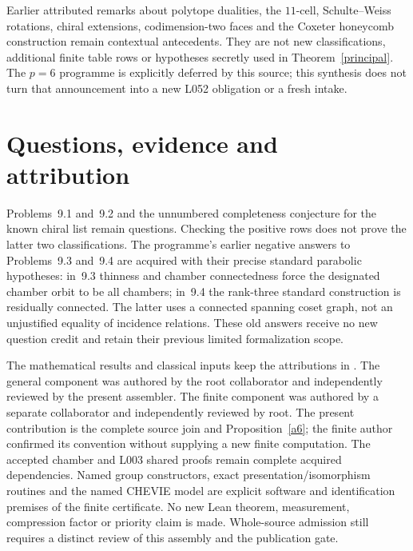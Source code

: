 \documentclass[11pt,a4paper]{article}
\begin{document}
Earlier attributed remarks about polytope dualities, the $11$-cell,
Schulte--Weiss rotations, chiral extensions, codimension-two faces and the
Coxeter honeycomb construction remain contextual antecedents. They are not
new classifications, additional finite table rows or hypotheses secretly
used in Theorem~\ref{principal}. The $p=6$ programme is explicitly deferred
by this source; this synthesis does not turn that announcement into a new
L052 obligation or a fresh intake.

\section{Questions, evidence and attribution}
Problems~9.1 and~9.2 and the unnumbered completeness conjecture for the
known chiral list remain questions. Checking the positive rows does not
prove the latter two classifications. The programme's earlier negative
answers to Problems~9.3 and~9.4 are acquired with their precise standard
parabolic hypotheses: in~9.3 thinness and chamber connectedness force the
designated chamber orbit to be all chambers; in~9.4 the rank-three standard
construction is residually connected. The latter uses a connected spanning
coset graph, not an unjustified equality of incidence relations. These old
answers receive no new question credit and retain their previous limited
formalization scope.

The mathematical results and classical inputs keep the attributions in
\cite{source}. The general component was authored by the root collaborator
and independently reviewed by the present assembler. The finite component
was authored by a separate collaborator and independently reviewed by root.
The present contribution is the complete source join and
Proposition~\ref{a6}; the finite author confirmed its convention without
supplying a new finite computation. The accepted chamber and L003 shared
proofs remain complete acquired dependencies. Named group constructors,
exact presentation/isomorphism routines and the named CHEVIE model are
explicit software and identification premises of the finite certificate.
No new Lean theorem, measurement, compression factor or priority claim is
made. Whole-source admission still requires a distinct review of this
assembly and the publication gate.
\end{document}
